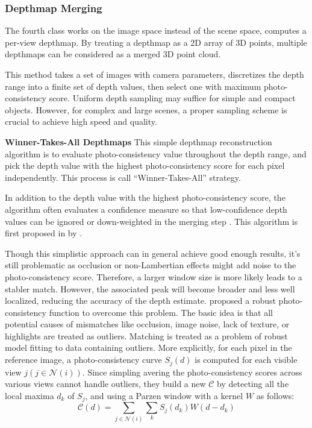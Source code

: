 \subsubsection{Depthmap Merging}
The fourth class works on the image space instead of the scene space, computes a per-view depthmap. By treating a depthmap as a 2D array of 3D points, multiple depthmaps can be considered as a merged 3D point cloud.

This method takes a set of images with camera parameters, discretizes the depth range into a finite set of depth values, then select one with maximum photo-consistency score. Uniform depth sampling may suffice for simple and compact objects. However, for complex and large scenes, a proper sampling scheme is crucial to achieve high speed and quality.

\textbf{Winner-Takes-All Depthmaps} This simple depthmap reconstruction algorithm is to evaluate photo-consistency value throughout the depth range, and pick the depth value with the highest photo-consistency score for each pixel independently. This process is call ``Winner-Takes-All'' strategy.


In addition to the depth value with the highest photo-consistency score, the algorithm often evaluates a confidence measure so that low-confidence depth values can be ignored or down-weighted in the merging step \cite{hu2012quantitative}. This algorithm is first proposed in by \citeauthor{esteban2004silhouette}.

Though this simplistic approach can in general achieve good enough results, it's still problematic as occlusion or non-Lambertian effects might add noise to the photo-consistency score. Therefore, a larger window size is more likely leads to a stabler match. However, the associated peak will become broader and less well localized, reducing the accuracy of the depth estimate. \citeauthor{vogiatzis2007multiview} proposed a robust photo-consistency function to overcome this problem. The basic idea is that all potential causes of mismatches like occlusion, image noise, lack of texture, or highlights are treated as outliers. Matching is treated as a problem of robust model fitting to data containing outliers. More explicitly, for each pixel in the reference image, a photo-consistency curve $S_j(d)$ is computed for each visible view $j(j\in\mathcal{N}(i))$. Since simpling avering the photo-consistency scores across various views cannot handle outliers, they build a new $\mathcal{C}$ by detecting all the local maxima $d_k$ of $S_j$, and using a Parzen window with a kernel $W$ as follows:
\begin{equation}
\mathcal{C}(d) = \sum_{j\in\mathcal{N}(i)}\sum_k S_j(d_k)W(d - d_k)
\end{equation}\

